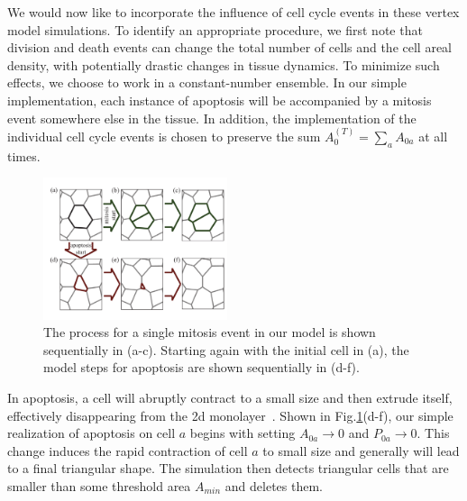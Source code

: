 \documentclass[
reprint
,aps
,amssymb
,amsmath
,superscriptaddress
]{revtex4-1}
\begin{document}
We would now like to incorporate the influence of cell cycle events in these vertex model simulations. To identify an appropriate procedure, we first note that division and death events can change the total number of cells and the cell areal density, with potentially drastic changes in tissue dynamics. 
To minimize such effects, we choose to work in a constant-number ensemble. In our simple implementation, each instance of apoptosis will be accompanied by a mitosis event somewhere else in the tissue. In addition, the implementation of the individual cell cycle events is chosen to preserve the sum $A_{0}^{(T)}= \sum_{a}A_{0a}$ at all times.


\begin{figure}[!t]  
\begin{center}
    \includegraphics[width=0.48\textwidth]{manuscript_images_birth_death_cartoon.pdf}
    \caption{\label{fig:dd_birth_death_cartoon} The process for a single mitosis event in our model is shown sequentially in (a-c). Starting again with the initial cell in (a), the model steps for apoptosis are shown sequentially in (d-f).}
    \end{center}
\end{figure}

In apoptosis, a cell will abruptly contract to a small size and then extrude itself, effectively disappearing from the 2d monolayer~\cite{Rosenblatt2001}. Shown in Fig.\ref{fig:dd_birth_death_cartoon}(d-f), our simple realization of apoptosis on cell $a$ begins with setting $A_{0a} \rightarrow 0$ and $P_{0a} \rightarrow 0$. This change induces the rapid contraction of cell $a$ to small size and generally will lead to a final triangular shape. The simulation then detects triangular cells that are smaller than some threshold area $A_{min}$ and deletes them.
\end{document}
